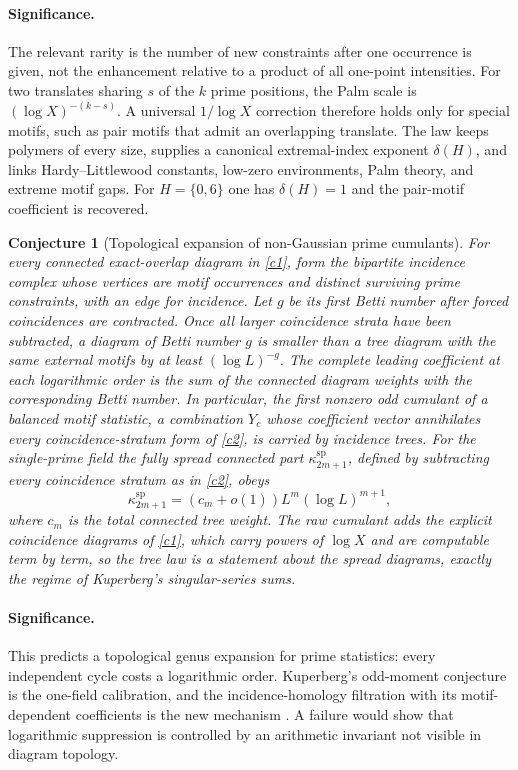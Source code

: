 \documentclass[11pt]{article}
\newtheorem{conjecture}{Conjecture}
\begin{document}
\paragraph{Significance.}
The relevant rarity is the number of new constraints after one occurrence is given, not
the enhancement relative to a product of all one-point intensities.  For two translates
sharing $s$ of the $k$ prime positions, the Palm scale is
$(\log X)^{-(k-s)}$.  A universal $1/\log X$ correction therefore holds
only for special motifs, such as pair motifs that admit an overlapping translate.  The law keeps polymers of
every size, supplies a canonical extremal-index exponent $\delta(H)$, and links
Hardy--Littlewood constants, low-zero environments, Palm theory, and extreme motif gaps.
For $H=\{0,6\}$ one has $\delta(H)=1$ and the pair-motif coefficient is
recovered.

\begin{conjecture}[Topological expansion of non-Gaussian prime cumulants]\label{c5}
For every connected exact-overlap diagram in \cref{c1}, form the bipartite incidence
complex whose vertices are motif occurrences and distinct surviving prime constraints,
with an edge for incidence.  Let $g$ be its first Betti number after forced coincidences
are contracted.  Once all larger coincidence strata have been subtracted, a diagram of
Betti number $g$ is smaller than a tree diagram with the same external motifs by at
least $(\log L)^{-g}$.  The complete leading coefficient at each logarithmic order is
the sum of the connected diagram weights with the corresponding Betti number.  In
particular, the first nonzero odd cumulant of a balanced motif statistic, a
combination $Y_c$ whose coefficient vector annihilates every coincidence-stratum form
of \cref{c2}, is carried by
incidence trees.  For the single-prime field the fully spread connected part
$\kappa^{\mathrm{sp}}_{2m+1}$, defined by subtracting every coincidence stratum as in
\cref{c2}, obeys
\[
 \kappa^{\mathrm{sp}}_{2m+1}=(c_m+o(1))L^m(\log L)^{m+1},
\]
where $c_m$ is the total connected tree weight.  The raw cumulant adds the explicit
coincidence diagrams of \cref{c1}, which carry powers of $\log X$ and are computable
term by term, so the tree law is a statement about the spread diagrams, exactly the
regime of Kuperberg's singular-series sums.
\end{conjecture}

\paragraph{Significance.}
This predicts a topological genus expansion for prime statistics: every independent
cycle costs a logarithmic order.  Kuperberg's odd-moment conjecture is the one-field
calibration, and the incidence-homology filtration with its motif-dependent
coefficients is the new mechanism \cite{Kuperberg}.  A failure would show that logarithmic suppression
is controlled by an arithmetic invariant not visible in diagram topology.
\end{document}
